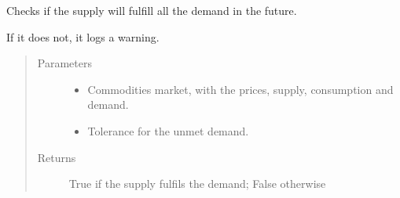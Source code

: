 \documentclass[letterpaper,10pt,english]{sphinxmanual}
\begin{document}
\begin{fulllineitems}
\label{\detokenize{api:muse.mca.check_demand_fulfillment}}
Checks if the supply will fulfill all the demand in the future.

If it does not, it logs a warning.
\begin{quote}\begin{description}
\item[{Parameters}] \leavevmode\begin{itemize}
\item {} 
 \textendash{} Commodities market, with the prices, supply, consumption and demand.

\item {} 
 \textendash{} Tolerance for the unmet demand.

\end{itemize}

\item[{Returns}] \leavevmode
True if the supply fulfils the demand; False otherwise

\end{description}\end{quote}

\end{fulllineitems}

\end{document}
